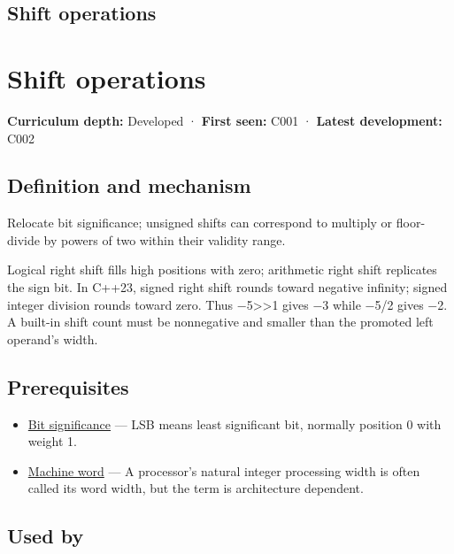 \hypertarget{appendix-73425b25118e}{}
\section*{Shift operations}
\chapter{Shift operations}\label{appendix-73425b25118e-shift-operations}

\textbf{Curriculum depth:} Developed · \textbf{First seen:} C001 · \textbf{Latest development:} C002

\section{Definition and mechanism}\label{appendix-73425b25118e-definition-and-mechanism}

Relocate bit significance; unsigned shifts can correspond to multiply or floor-divide by powers of two within their validity range.

Logical right shift fills high positions with zero; arithmetic right shift replicates the sign bit. In C++23, signed right shift rounds toward negative infinity; signed integer division rounds toward zero. Thus −5\textgreater\textgreater1 gives −3 while −5/2 gives −2. A built-in shift count must be nonnegative and smaller than the promoted left operand's width.

\section{Prerequisites}\label{appendix-73425b25118e-prerequisites}

\begin{itemize}
\tightlist
\item
  \hyperref[appendix-280445746493]{Bit significance} --- LSB means least significant bit, normally position 0 with weight 1.
\item
  \hyperref[appendix-d67a19507dc5]{Machine word} --- A processor's natural integer processing width is often called its word width, but the term is architecture dependent.
\end{itemize}

\section{Used by}\label{appendix-73425b25118e-used-by}

